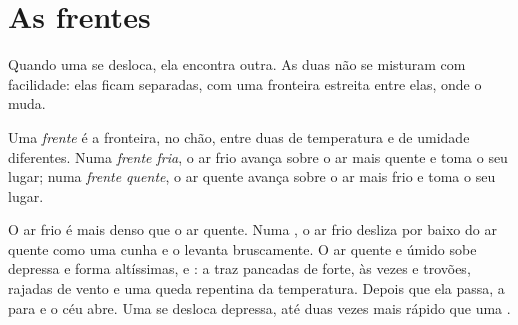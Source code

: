 \section{As frentes}

Quando uma  se desloca, ela encontra outra. As duas não se
misturam com facilidade: elas ficam separadas, com uma fronteira estreita
entre elas, onde o  muda.

\begin{definition}[Frente]\label{def:g8:fronts-and-weather-maps:front}
Uma \emph{frente} é a fronteira, no chão, entre duas  de temperatura e de umidade diferentes. Numa \emph{frente
fria}, o ar frio avança sobre o ar mais quente e toma o
seu lugar; numa \emph{frente quente}, o ar quente
avança sobre o ar mais frio e toma o seu lugar.
\end{definition}

O ar frio é mais denso que o ar quente. Numa , o ar frio
desliza por baixo do ar quente como uma cunha e o levanta bruscamente. O
ar quente e úmido sobe depressa e forma  altíssimas,  e
: a  traz pancadas de  forte, às vezes  e
trovões, rajadas de vento e uma queda repentina da temperatura. Depois que
ela passa, a  para e o céu abre. Uma  se desloca depressa,
até duas vezes mais rápido que uma .

